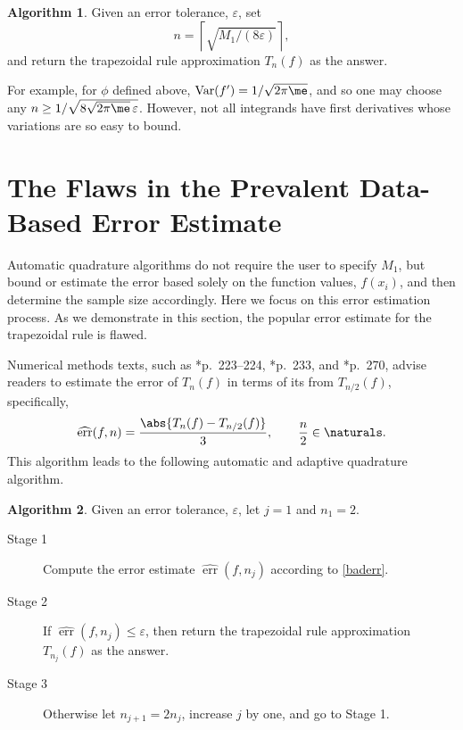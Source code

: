 \documentclass[]{amsart}
\DeclareMathOperator{\Var}{Var}
\DeclareMathOperator{\err}{err}
\newcommand{\herr}{\widehat{\err}}
\theoremstyle{definition}
\newtheorem{algo}{Algorithm}
\theoremstyle{remark}
\begin{document}
\begin{algo} Given an error tolerance, $\varepsilon$, set 
\begin{equation}\label{algo1n}
n = \left \lceil \sqrt{M_1/(8\varepsilon)} \right \rceil,
\end{equation}
and return the trapezoidal rule approximation $T_n(f)$ as the answer.
\end{algo}

For example, for $\phi$ defined above, $\Var(f')=1/\sqrt{2 \pi \me}$, and so one may choose any $n \ge 1/\sqrt{8\sqrt{2 \pi \me} \, \varepsilon}$.  However, not all integrands have first derivatives whose variations are so easy to bound.  

\section{The Flaws in the Prevalent Data-Based Error Estimate} \label{flawstopsec}
Automatic quadrature algorithms do not require the user to specify $M_1$, but bound or estimate the error based solely on the function values, $f(x_i)$, and then determine the sample size accordingly.  Here we focus on this error estimation process.  As we demonstrate in this section, the popular error estimate for the trapezoidal rule is flawed. 

Numerical methods texts, such as *{p.\ 223--224}, *{p.\ 233}, and  *{p.\ 270}, advise readers to estimate the error of $T_n(f)$ in terms of its from $T_{n/2}(f)$, specifically,
\begin{equation}\label{baderr}
\herr(f,n) = \frac{\abs{T_n(f) - T_{n/2}(f)}}{3}, \qquad \frac n2 \in \naturals.
\end{equation}
This algorithm leads to the following automatic and adaptive quadrature algorithm.

\begin{algo} \label{baderralgo} Given an error tolerance, $\varepsilon$, let $j=1$ and $n_1=2$.

\begin{description} 

\item[Stage 1] Compute the error estimate $\herr(f,n_j)$ according to \eqref{baderr}.

\item [Stage 2] If $\herr(f,n_j) \le \varepsilon$, then return the trapezoidal rule approximation $T_{n_j}(f)$ as the answer.  

\item [Stage 3] Otherwise let $n_{j+1}=2 n_j$, increase $j$ by one, and go to Stage 1.

\end{description}

\end{algo}
\end{document}
